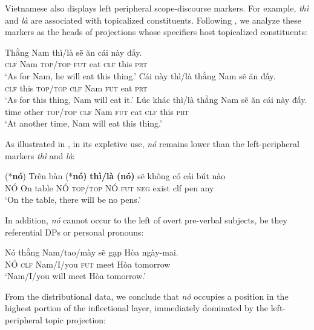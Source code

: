 \documentclass[output=paper]{LSP/langsci}
\begin{document}
Vietnamese also displays left peripheral scope-discourse markers. For example, \textit{thì} and \textit{là} are associated with topicalized constituents. Following \citet{Rizzi1997}, we analyze these markers as the heads of projections whose specifiers host topicalized constituents:

\ea%
    \label{ex:Greco:21}
	\ea
    \gll Thằng  Nam  thì/là    sẽ  ăn  cái  này  đấy.\\
	      \textsc{clf}  Nam  \textsc{top}/\textsc{top}  \textsc{fut}  eat  \textsc{clf}  this  \textsc{prt}\\
    \glt ‘As for Nam, he will eat this thing.’
	\ex \gll Cái  này  thì/là    thằng  Nam  sẽ  ăn  đấy.\\
			\textsc{clf}  this  \textsc{top}/\textsc{top}  \textsc{clf}  Nam  \textsc{fut}  eat  \textsc{prt}\\
		\glt ‘As for this thing, Nam will eat it.’
    \ex \gll Lúc  khác  thì/là    thằng  Nam  sẽ  ăn  cái  này đấy.\\
  			time  other  \textsc{top}/\textsc{top}  \textsc{clf}  Nam  \textsc{fut}  eat  \textsc{clf}  this \textsc{prt}\\
		\glt   ‘At another time, Nam will eat this thing.’
	\z
\z

As illustrated in , in its expletive use, \textit{nó} remains lower than the left-periph\-er\-al markers \textit{thì} and \textit{là}:

\ea%
    \label{ex:Greco:22}
    \ea
    \gll 	(*\textbf{nó}) Trên  bàn  (*\textbf{nó)}   \textbf{thì/là}    \textbf{(nó)}  sẽ  không có cái   bút   nào \\
			NÓ  On  table  NÓ  \textsc{top}/\textsc{top}   NÓ  \textsc{fut}  \textsc{neg}  exist {clf}   pen   any \\
\glt     ‘On the table, there will be no pens.’
    \z
\z

In addition, \textit{nó} cannot occur to the left of overt pre-verbal subjects, be they referential DPs or personal pronouns:

\ea%
    \label{ex:Greco:23}
    \gll  *Nó thằng Nam/tao/mày s\~{e}  gạp  Hòa  ngày-mai. \\
     NÓ   \textsc{clf}   Nam/I/you    \textsc{fut}   meet   Hòa   tomorrow\\	
     \glt    ‘Nam/I/you will meet Hòa tomorrow.’ 
    \z

From the distributional data, we conclude that \textit{nó} occupies a position in the highest portion of the inflectional layer, immediately dominated by the left-pe\-riph\-er\-al topic projection:
\end{document}
